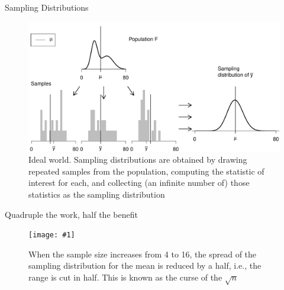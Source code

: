 \documentclass[handout]{beamer}\usepackage[]{graphicx}\usepackage[]{color}
\newenvironment{knitrout}{}{} %
\newcommand {\framedgraphiccaption}[2] {
	\begin{figure}
		\centering
		\texttt{[image: \#1]}
		\caption{#2}
	\end{figure}
}
\begin{document}
\begin{frame}[fragile]{Sampling Distributions}

\begin{knitrout}\scriptsize
{}\color{fgcolor}\begin{figure}

{\centering \includegraphics[width=1\linewidth]{figure/unnamed-chunk-1-1} 

}

\caption[Ideal world]{Ideal world. Sampling distributions are obtained by drawing repeated samples from the population, computing the statistic of interest for each, and collecting (an infinite number of) those statistics as the sampling distribution}\label{fig:unnamed-chunk-1}
\end{figure}


\end{knitrout}

\end{frame}


\begin{frame}[fragile]{Quadruple the work, half the benefit}

\framedgraphiccaption{../sampling_dist/ROOToceanAll.png}{When the sample size increases from 4 to 16, the spread of the sampling distribution for the mean is reduced by a half, i.e., the range is cut in half. This is known as the curse of the $\sqrt{n}$}
\end{frame}
\end{document}
